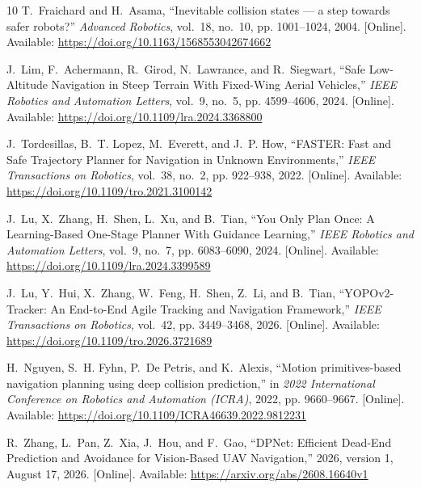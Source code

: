 \documentclass[journal]{IEEEtran}
\begin{document}
\begin{thebibliography}{10}
\BIBentryALTinterwordspacing
T.~Fraichard and H.~Asama, ``{Inevitable collision states --- a step towards
  safer robots?}'' \emph{Advanced Robotics}, vol.~18, no.~10, pp. 1001--1024,
  2004. [Online]. Available: \url{https://doi.org/10.1163/1568553042674662}
\BIBentrySTDinterwordspacing

\BIBentryALTinterwordspacing
J.~Lim, F.~Achermann, R.~Girod, N.~Lawrance, and R.~Siegwart, ``{Safe
  Low-Altitude Navigation in Steep Terrain With Fixed-Wing Aerial Vehicles},''
  \emph{IEEE Robotics and Automation Letters}, vol.~9, no.~5, pp. 4599--4606,
  2024. [Online]. Available: \url{https://doi.org/10.1109/lra.2024.3368800}
\BIBentrySTDinterwordspacing

\BIBentryALTinterwordspacing
J.~Tordesillas, B.~T. Lopez, M.~Everett, and J.~P. How, ``{FASTER: Fast and
  Safe Trajectory Planner for Navigation in Unknown Environments},'' \emph{IEEE
  Transactions on Robotics}, vol.~38, no.~2, pp. 922--938, 2022. [Online].
  Available: \url{https://doi.org/10.1109/tro.2021.3100142}
\BIBentrySTDinterwordspacing

\BIBentryALTinterwordspacing
J.~Lu, X.~Zhang, H.~Shen, L.~Xu, and B.~Tian, ``{You Only Plan Once: A
  Learning-Based One-Stage Planner With Guidance Learning},'' \emph{IEEE
  Robotics and Automation Letters}, vol.~9, no.~7, pp. 6083--6090, 2024.
  [Online]. Available: \url{https://doi.org/10.1109/lra.2024.3399589}
\BIBentrySTDinterwordspacing

\BIBentryALTinterwordspacing
J.~Lu, Y.~Hui, X.~Zhang, W.~Feng, H.~Shen, Z.~Li, and B.~Tian,
  ``{YOPOv2-Tracker: An End-to-End Agile Tracking and Navigation Framework},''
  \emph{IEEE Transactions on Robotics}, vol.~42, pp. 3449--3468, 2026.
  [Online]. Available: \url{https://doi.org/10.1109/tro.2026.3721689}
\BIBentrySTDinterwordspacing

\BIBentryALTinterwordspacing
H.~Nguyen, S.~H. Fyhn, P.~{De Petris}, and K.~Alexis, ``Motion primitives-based
  navigation planning using deep collision prediction,'' in \emph{2022
  International Conference on Robotics and Automation (ICRA)}, 2022, pp.
  9660--9667. [Online]. Available:
  \url{https://doi.org/10.1109/ICRA46639.2022.9812231}
\BIBentrySTDinterwordspacing

\BIBentryALTinterwordspacing
R.~Zhang, L.~Pan, Z.~Xia, J.~Hou, and F.~Gao, ``{DPNet: Efficient Dead-End
  Prediction and Avoidance for Vision-Based UAV Navigation},'' 2026, version 1,
  August 17, 2026. [Online]. Available:
  \url{https://arxiv.org/abs/2608.16640v1}
\BIBentrySTDinterwordspacing


\end{thebibliography}
\end{document}
